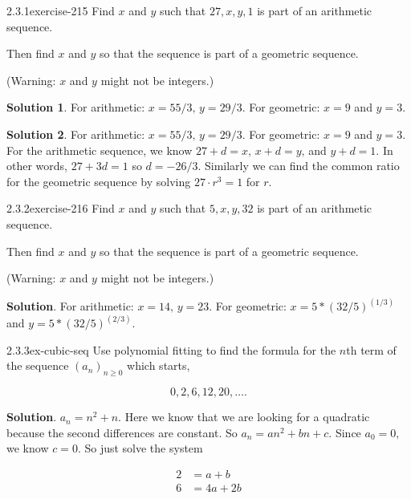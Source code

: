 \documentclass[twoside,11pt,]{book}
\numberwithin{equation}{chapter}
\newcommand{\amp}{&}
\begin{document}
\par\smallskip
\begin{divisionsolution}{2.3.1}{}{exercise-215}%
\hypertarget{p-3317}{}%
Find \(x\) and \(y\) such that \(27,
x, y, 1\) is part of an arithmetic sequence.%
\par
\hypertarget{p-3318}{}%
Then find \(x\) and \(y\) so that the sequence is part of a geometric sequence.%
\par
\hypertarget{p-3319}{}%
(Warning: \(x\) and \(y\) might not be integers.)%
\par\smallskip%
\noindent\textbf{Solution 1}.\quad%
\hypertarget{p-3320}{}%
For arithmetic: \(x = 55/3\text{,}\) \(y = 29/3\text{.}\) For geometric: \(x = 9\) and \(y = 3\text{.}\)%
\par\smallskip%
\noindent\textbf{Solution 2}.\quad%
\hypertarget{p-3321}{}%
For arithmetic: \(x = 55/3\text{,}\) \(y = 29/3\text{.}\) For geometric: \(x = 9\) and \(y = 3\text{.}\) For the arithmetic sequence, we know \(27 + d = x\text{,}\) \(x + d = y\text{,}\) and \(y + d = 1\text{.}\) In other words, \(27 + 3d = 1\) so \(d = -26/3\text{.}\) Similarly we can find the common ratio for the geometric sequence by solving \(27\cdot r^3 = 1\) for \(r\text{.}\)%
\end{divisionsolution}%
\begin{divisionsolution}{2.3.2}{}{exercise-216}%
\hypertarget{p-3326}{}%
Find \(x\) and \(y\) such that \(5,
x, y, 32\) is part of an arithmetic sequence.%
\par
\hypertarget{p-3327}{}%
Then find \(x\) and \(y\) so that the sequence is part of a geometric sequence.%
\par
\hypertarget{p-3328}{}%
(Warning: \(x\) and \(y\) might not be integers.)%
\par\smallskip%
\noindent\textbf{Solution}.\quad%
\hypertarget{p-3329}{}%
For arithmetic: \(x = 14\text{,}\) \(y = 23\text{.}\) For geometric: \(x = 5*(32/5)^(1/3)\) and \(y = 5*(32/5)^(2/3)\text{.}\)%
\end{divisionsolution}%
\begin{divisionsolution}{2.3.3}{}{ex-cubic-seq}%
\hypertarget{p-3332}{}%
Use polynomial fitting to find the formula for the \(n\)th term of the sequence \((a_n)_{n \ge 0}\) which starts,%
\par
\hypertarget{p-3333}{}%
%
\begin{equation*}
0, 2, 6, 12, 20, \ldots 
\text{.}
\end{equation*}
%
\par\smallskip%
\noindent\textbf{Solution}.\quad%
\hypertarget{p-3334}{}%
\(a_n = n^2 + n\text{.}\) Here we know that we are looking for a quadratic because the second differences are constant. So \(a_n = an^2 + bn + c\text{.}\) Since \(a_0 = 0\text{,}\) we know \(c= 0\text{.}\) So just solve the system%
\par
\hypertarget{p-3335}{}%
%
\begin{equation*}
\begin{aligned}
2 \amp = a + b\\
6 \amp = 4a + 2b
\end{aligned}
\end{equation*}
%
\end{divisionsolution}%
\end{document}
